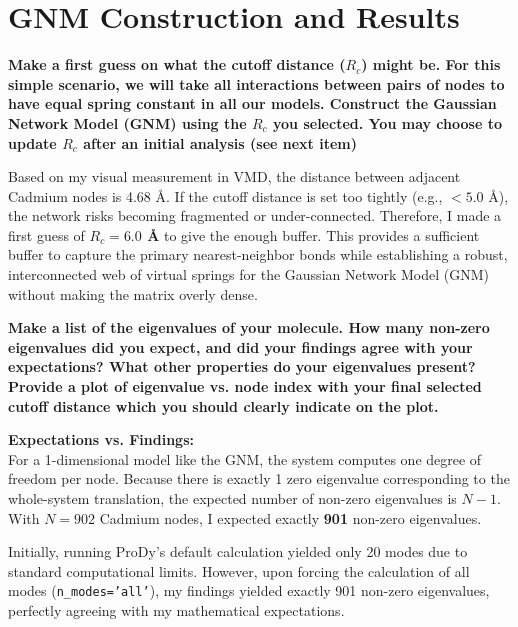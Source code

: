 \documentclass[11pt, a4paper]{article}
\begin{document}
\newpage

\section*{GNM Construction and Results}

\textbf{Make a first guess on what the cutoff distance ($R_c$) might be. For this simple scenario, we will take all interactions between pairs of nodes to have equal spring constant in all our models. Construct the Gaussian Network Model (GNM) using the $R_c$ you selected. You may choose to update $R_c$ after an initial analysis (see next item)}
\vspace{0.5cm}

Based on my visual measurement in VMD, the distance between adjacent Cadmium nodes is 4.68 \AA. If the cutoff distance is set too tightly (e.g., $< 5.0$ \AA), the network risks becoming fragmented or under-connected. Therefore, I made a first guess of \textbf{$R_c = 6.0$ \AA} to give the enough buffer. This provides a sufficient buffer to capture the primary nearest-neighbor bonds while establishing a robust, interconnected web of virtual springs for the Gaussian Network Model (GNM) without making the matrix overly dense. 

\vspace{1.5cm}

\newpage

\textbf{Make a list of the eigenvalues of your molecule. How many non-zero eigenvalues did you expect, and did your findings agree with your expectations? What other properties do your eigenvalues present? Provide a plot of eigenvalue vs. node index with your final selected cutoff distance which you should clearly indicate on the plot.}
\vspace{0.5cm}

\textbf{Expectations vs. Findings:}\\
For a 1-dimensional model like the GNM, the system computes one degree of freedom per node. Because there is exactly 1 zero eigenvalue corresponding to the whole-system translation, the expected number of non-zero eigenvalues is $N - 1$. With $N = 902$ Cadmium nodes, I expected exactly \textbf{901} non-zero eigenvalues. 

Initially, running ProDy's default calculation yielded only 20 modes due to standard computational limits. However, upon forcing the calculation of all modes (\texttt{n\_modes='all'}), my findings yielded exactly 901 non-zero eigenvalues, perfectly agreeing with my mathematical expectations.
\end{document}
